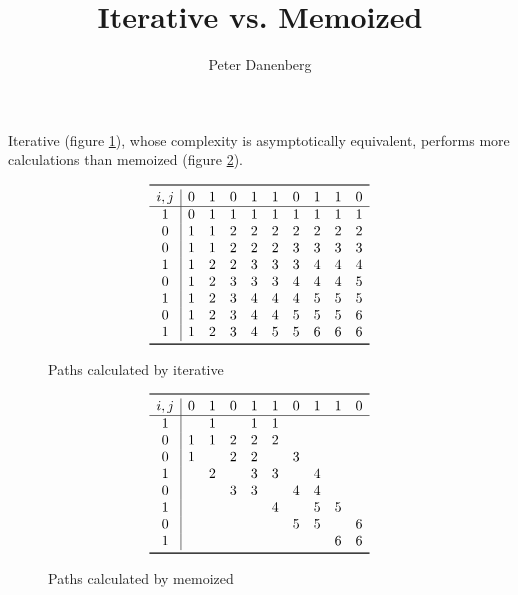 \documentclass{article}
\title{Iterative vs. Memoized \proc{LCS-Length}}
\author{Peter Danenberg}
\begin{document}
\maketitle

Iterative  (figure \ref{fig:iter}), whose complexity
is asymptotically equivalent, performs more calculations than memoized
 (figure \ref{fig:memo}).
\begin{figure}[ht]
  \[
    \begin{array}{c|ccccccccc}
      \toprule i, j
      & 0 & 1 & 0 & 1 & 1 & 0 & 1 & 1 & 0\\
      \hline
      1 & 0 & 1 & 1 & 1 & 1 & 1 & 1 & 1 & 1\\
      0 & 1 & 1 & 2 & 2 & 2 & 2 & 2 & 2 & 2\\
      0 & 1 & 1 & 2 & 2 & 2 & 3 & 3 & 3 & 3\\
      1 & 1 & 2 & 2 & 3 & 3 & 3 & 4 & 4 & 4\\
      0 & 1 & 2 & 3 & 3 & 3 & 4 & 4 & 4 & 5\\
      1 & 1 & 2 & 3 & 4 & 4 & 4 & 5 & 5 & 5\\
      0 & 1 & 2 & 3 & 4 & 4 & 5 & 5 & 5 & 6\\
      1 & 1 & 2 & 3 & 4 & 5 & 5 & 6 & 6 & 6\\
      \bottomrule
    \end{array}
    \]
  \caption{Paths calculated by iterative }
  \label{fig:iter}
\end{figure}
\begin{figure}[ht]
  \[
    \begin{array}{c|cccccccccc}
      \toprule i, j
      & 0 & 1 & 0 & 1 & 1 & 0 & 1 & 1 & 0\\
      \hline
      1 & \, & 1 & \, & 1 & 1 & \, & \, & \, & \,\\
      0 & 1 & 1 & 2 & 2 & 2 & \, & \, & \, & \,\\
      0 & 1 & \, & 2 & 2 & \, & 3 & \, & \, & \,\\
      1 & \, & 2 & \, & 3 & 3 & \, & 4 & \, & \,\\
      0 & \, & \, & 3 & 3 & \, & 4 & 4 & \, & \,\\
      1 & \, & \, & \, & \, & 4 & \, & 5 & 5 & \,\\
      0 & \, & \, & \, & \, & \, & 5 & 5 & \, & 6\\
      1 & \, & \, & \, & \, & \, & \, & \, & 6 & 6\\
      \bottomrule
    \end{array}
    \]
  \caption{Paths calculated by memoized }
  \label{fig:memo}
\end{figure}
\end{document}

